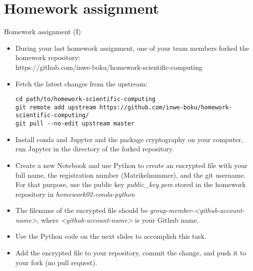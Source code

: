 
\section{Homework assignment}

\begin{frame}[fragile]{Homework assignment (I)}

	\begin{itemize}
		\item During your last homework assignment, one of your team members forked the homework repository:\\
            https://github.com/inwe-boku/homework-scientific-computing
		\item Fetch the latest changes from the upstream:
            {\scriptsize
            \begin{verbatim}
cd path/to/homework-scientific-computing
git remote add upstream https://github.com/inwe-boku/homework-scientific-computing/
git pull --no-edit upstream master\end{verbatim}
            }
		\item Install conda and Jupyter and the package cryptography on your computer, run Jupyter in the directory of the
            forked repository.
		\item Create a new Notebook and use Python to create an encrypted file with your full name, the registration number (Matrikelnummer), and the git username. For that purpose, use the public key \textit{public\_key.pem} stored in the homework repository in \textit{homework02-conda-python}
		\item The filename of the encrypted file should be
            \textit{group-member-<github-account-name>}, where \textit{<github-account-name>} is
            your Github name.
		\item Use the Python code on the next slides to accomplish this task.
		\item Add the encrypted file to your repository, commit the change, and push it to your
            fork (no pull request).
	\end{itemize}


\end{frame}

